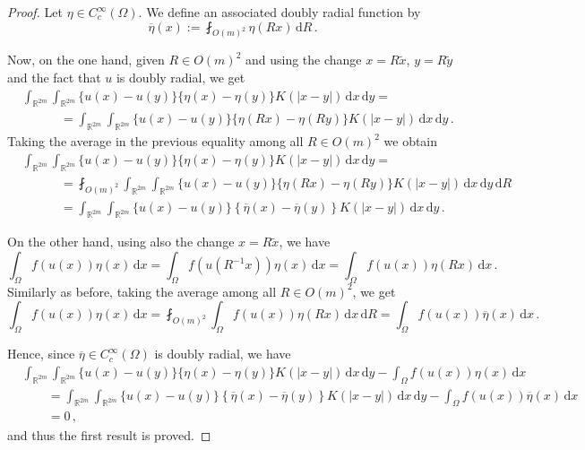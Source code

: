 \documentclass[12pt,reqno]{amsart}
\theoremstyle{definition}
\theoremstyle{remark}
\newcommand{\con}[1]{\mathbb{#1}}
\newcommand{\R}{\con{R}} %
\renewcommand{\d}{\,\mathrm{d}} %
\newcommand{\average}{\fint}
\numberwithin{equation}{section}
\begin{document}
\begin{proof}
	Let $\eta \in C^\infty_c(\Omega)$. We define an associated doubly radial function by
	$$
	\overline{\eta}(x) := \average_{O(m)^2}\eta(R x)\d R\,.
	$$
	
	Now, on the one hand, given $R\in O(m)^2$ and using the change $x = R\tilde{x}$, $y = R \tilde{y}$ and the fact that $u$ is doubly radial, we get
	\begin{align*}
	&\int_{\R^{2m}}\int_{\R^{2m}} \{u(x)-u(y)\}\{\eta(x)-\eta(y)\} K(|x-y|) \d x \d y = \\
	&\quad \quad \quad = \int_{\R^{2m}}\int_{\R^{2m}} \{u(x)-u(y)\}\{\eta(R x)-\eta(R y)\} K(|x-y|) \d x \d y\,.
	\end{align*}
	Taking the average in the previous equality among all $R\in O(m)^2$ we obtain
	\begin{align*}
	& \int_{\R^{2m}}\int_{\R^{2m}} \{u(x)-u(y)\}\{\eta(x)-\eta(y)\} K(|x-y|) \d x \d y = \\
	&\quad \quad \quad =\average_{O(m)^2} \int_{\R^{2m}}\int_{\R^{2m}} \{u(x)-u(y)\}\{\eta(R x)-\eta(R y)\} K(|x-y|) \d x \d y \d R \\
	&\quad \quad \quad= \int_{\R^{2m}}\int_{\R^{2m}} \{u(x)-u(y)\}\left \{\overline{\eta}(x) -\overline{\eta}(y)  \right \} K(|x-y|) \d x \d y \,.
	\end{align*}
	
	On the other hand, using also the change $x = R\tilde{x}$, we have
	$$
	\int_{\Omega} f(u(x)) \eta(x) \d x = \int_{\Omega} f(u(R^{-1}x)) \eta(x) \d x = \int_{\Omega} f(u(x)) \eta(Rx) \d x\,.
	$$
	Similarly as before, taking the average among all $R\in O(m)^2$, we get
	$$
	\int_{\Omega} f(u(x)) \eta(x) \d x = \average_{O(m)^2} \int_{\Omega} f(u(x)) \eta(Rx) \d x \d R = \int_{\Omega} f(u(x))\overline{\eta}(x) \d x\,.
	$$
	
	Hence, since $\overline{\eta} \in C^\infty_c(\Omega)$ is doubly radial, we have
	\begin{align*}
	&\int_{\R^{2m}}\int_{\R^{2m}} \{u(x)-u(y)\}\{\eta(x)-\eta(y)\} K(|x-y|) \d x \d y - \int_{\Omega} f(u(x)) \eta(x) \d x \\
	&\quad \quad= \int_{\R^{2m}}\int_{\R^{2m}} \{u(x)-u(y)\}\left \{\overline{\eta}(x) -\overline{\eta}(y)  \right \} K(|x-y|) \d x \d y - \int_{\Omega} f(u(x))\overline{\eta}(x) \d x \\
	&\quad \quad= 0\,,
	\end{align*}
	and thus the first result is proved.
	

\end{proof}
\end{document}
